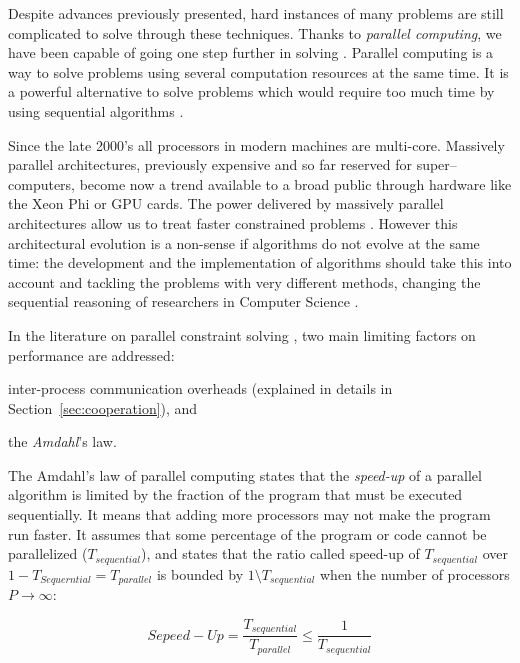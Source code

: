 Despite advances previously presented, hard instances of many problems are still complicated to solve through these techniques. Thanks to \textit{parallel computing}, we have been capable of going one step further in solving \csps. Parallel computing is a way to solve problems using several computation resources at the same time. It is a powerful alternative to solve problems which would require too much time by using sequential algorithms \cite{Grama2003}. %

Since the late 2000's all processors in modern machines are multi-core. Massively parallel architectures, previously expensive and so far reserved for super--computers, become now a trend available to a broad public through hardware like the Xeon Phi or GPU cards. The power delivered by massively parallel architectures allow us to treat faster constrained problems \cite{Borkar2007}. However this architectural evolution is a non-sense if algorithms do not evolve at the same time: the development and the implementation of algorithms should take this into account and tackling the problems with very different methods, changing the sequential reasoning of researchers in Computer Science \cite{Hill2008, Sanders2014}. 

In the literature on parallel constraint solving \cite{Gent}, two main limiting factors on performance are addressed: \begin{inparaenum}[1-] \item inter-process communication overheads (explained in details in Section~\ref{sec:cooperation}), and \item the \textit{Amdahl}'s law. \end{inparaenum} The Amdahl's law of parallel computing states that the \textit{speed-up} of a parallel algorithm is limited by the fraction of the program that must be executed sequentially. It means that adding more processors may not make the program run faster. It assumes that some percentage of the program or code cannot be parallelized ($T_{sequential}$), and states that the ratio called speed-up of $T_{sequential}$ over $1 - T_{Sequerntial} = T_{parallel}$ is bounded by $1\setminus T_{sequential}$ when the number of processors $P \rightarrow \infty$:

\begin{equation}\label{amdahl}
Sepeed-Up = \frac{T_{sequential}}{T_{parallel}} \leq \frac{1}{T_{sequential}}
\end{equation}

